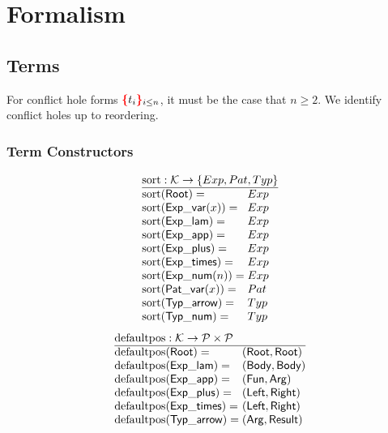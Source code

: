 \section{Formalism}


\subsection{Terms}

\figureTermSyntaxContent

For conflict hole forms $\conflictHole[i \leq n]{t_i}$,
it must be the case that $n \geq 2$.
We identify conflict holes up to reordering.


\subsubsection{Term Constructors}

\[
  \arraycolsep=0pt
  \begin{array}{ll}
    \multicolumn{2}{l}{\sortOp : \K \to \SetOf{Exp, Pat, Typ}} \\
    \hline
    \sort{\Root}={} & Exp \\
    \sort{\ExpVar(x)}={} & Exp \\
    \sort{\ExpLam}={} & Exp \\
    \sort{\ExpApp}={} & Exp \\
    \sort{\ExpPlus}={} & Exp \\
    \sort{\ExpTimes}={} & Exp \\
    \sort{\ExpNum(n)}={} & Exp \\
    \sort{\PatVar(x)}={} & Pat \\
    \sort{\TypArrow}={} & Typ \\
    \sort{\TypNum}={} & Typ \\
  \end{array}
\]
%
\figureArityContent
%
\[
  \arraycolsep=0pt
  \begin{array}{ll}
    \multicolumn{2}{l}{\defaultposOp : \K \to \P \times \P} \\
    \hline
    \defaultpos{\Root}={} & (\Root, \Root) \\
    \defaultpos{\ExpLam}={} & (\LamBody, \LamBody) \\
    \defaultpos{\ExpApp}={} & (\AppFun, \AppArg) \\
    \defaultpos{\ExpPlus}={} & (\PlusLeft, \PlusRight) \\
    \defaultpos{\ExpTimes}={} & (\TimesLeft, \TimesRight) \\
    \defaultpos{\TypArrow}={} & (\ArrowArg, \ArrowResult) \\
  \end{array}
\]
%


